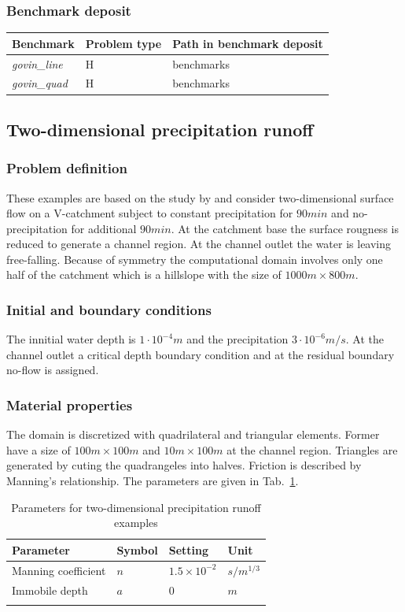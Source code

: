 \subsubsection*{Benchmark deposit}
%
\begin{tabular}{|l|l|l|}
  \hline
  Benchmark & Problem type & Path in benchmark deposit \\
  \hline
  \emph{govin\_line} & H & benchmarks\verb \OVERLAND_FLOW\ \\
  \emph{govin\_quad} & H & benchmarks\verb \OVERLAND_FLOW\ \\
  \hline
\end{tabular}
%
%
\subsection{Two-dimensional precipitation runoff}
\label{sec:SFCGiammarco}
%
\subsubsection*{Problem definition}
%
These examples are based on the study  by \cite{Gian:96} and consider two-dimensional
surface flow on a V-catchment subject to constant precipitation for $90 min$ and no-precipitation for additional $90 min$. At the catchment base the surface rougness is reduced to generate a channel region. At the channel outlet the water is leaving free-falling.
Because of symmetry the computational domain involves only one half of the catchment which is a hillslope with the size of $1000 m\times 800 m$.
%
\subsubsection*{Initial and boundary conditions}
%
The innitial water depth is $1\cdot 10^{-4}m$ and the precipitation $3 \cdot 10^{-6}m/s$. At the channel outlet a critical depth boundary condition and at the residual boundary no-flow is assigned.
%
\subsubsection*{Material properties}
%
The domain is discretized with quadrilateral and triangular elements. Former have a size of $100m \times 100m$ and $10 m \times 100 m $ at the channel region. Triangles are generated by cuting the quadrangeles into halves. Friction is described by Manning's relationship. The parameters are given in Tab.~\ref{OLF:giamarcoSetting}.
\begin{table}[H]
 \centering
 \caption{Parameters for two-dimensional precipitation runoff examples}
 \centering \label{OLF:giamarcoSetting}
 \begin{tabular}{llll}
 \hline\hline\noalign{\smallskip}
 {\bf Parameter} & {\bf Symbol} & {\bf Setting} & {\bf Unit} \\ \hline
 Manning coefficient    & $n$  & $1.5\times 10^{-2}$ & $s/m^{1/3}$\\
 Immobile depth & $a$ & $0$ & $m$ \\
\noalign{\smallskip}\hline\hline
 \end{tabular}
\end{table}
%
